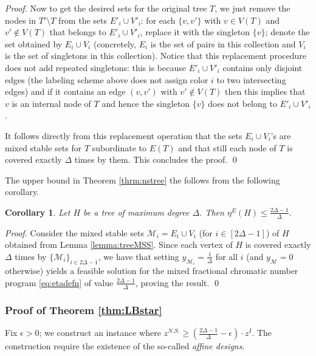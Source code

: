 \documentclass[smallextended]{svjour3}
\newtheorem{corollary}[proposition]{Corollary}
\begin{document}
\begin{proof}
	Now to get the desired sets for the original tree $T$, we just remove the nodes in $T'\setminus T$ from the sets $E'_i \cup V'_i$: for each $\{v, v'\}$ with $v \in V(T)$ and $v' \notin V(T)$ that belongs to $E'_i \cup V'_i$, replace it with the singleton $\{v\}$; denote the set obtained by $E_i \cup V_i$ (concretely, $E_i$ is the set of pairs in this collection and $V_i$ is the set of singletons in this collection). Notice that this replacement procedure does not add repeated singletons: this is because $E'_i \cup V'_i$ contains only disjoint edges (the labeling scheme above does not assign color $i$ to two intersecting edges) and if it contains an edge $(v,v')$ with $v' \notin V(T)$ then this implies that $v$ is an internal node of $T$ and hence the singleton $\{v\}$ does not belong to $E'_i \cup V'_i$.
	
	It follows directly from this replacement operation that the sets $E_i \cup V_i$'s are mixed stable sets for $T$ subordinate to $E(T)$ and that still each node of $T$ is covered exactly $\Delta$ times by them. This concludes the proof. {
\ifmp
	\hfill \qed
\fi
}
	\end{proof}

	The upper bound in Theorem \ref{thrm:nstree} the follows from the following corollary.

	\begin{corollary}
		Let $H$ be a tree of maximum degree $\Delta$. Then $\eta^E(H) \le \frac{2 \Delta -1}{\Delta}$.
	\end{corollary}
	
	\begin{proof}
		Consider the mixed stable sets ${\mathcal{M}}_i = E_i \cup V_i$ (for $i \in [2\Delta -1]$) of $H$ obtained from Lemma \ref{lemma:treeMSS}. Since each vertex of $H$ is covered exactly $\Delta$ times by $\{{\mathcal{M}}_i\}_{i \in 2\Delta - 1}$, we have that setting $y_{{\mathcal{M}}_i} = \frac{1}{\Delta}$ for all $i$ (and $y_{\mathcal{M}} = 0$ otherwise) yields a feasible solution for the mixed fractional chromatic number program \eqref{eq:etadefn} of value $\frac{2\Delta -1}{\Delta}$, proving the result.{
\ifmp
	\hfill \qed
\fi
}
	\end{proof}

	\subsubsection{Proof of Theorem \ref{thm:LBstar}}

	Fix $\epsilon > 0$; we construct an instance where $z^{N.S.} \ge \left(\frac{2\Delta-1}{\Delta} - \epsilon \right) \cdot z^I$. The construction require the existence of the so-called \emph{affine designs}.
\end{document}
